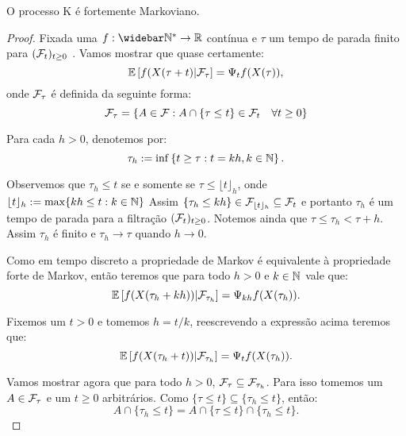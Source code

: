 \begin{proposicao}
  \label{prop:markov-forte}
  O processo K é fortemente Markoviano.
\end{proposicao}
\begin{proof}
  Fixada uma $f: \Nzb \to \R$ contínua e $\tau$ um tempo de parada
  finito para $({\mathcal{F}}_t)_{t \geq 0}$ . Vamos mostrar que quase
  certamente:
  \begin{equation}
    \label{eq:markov-forte}
    {\mathbb{E}} \left[ f(X(\tau + t) \middle| {\mathcal{F}}_\tau \right]
    = \Psi_t f (X(\tau)),
  \end{equation}
  onde ${\mathcal{F}}_\tau$ é definida da seguinte forma:
  \begin{displaymath}
    {\mathcal{F}}_\tau = \left\{
      A \in {\mathcal{F}}:  A \cap \{\tau \leq t\} \in {\mathcal{F}}_t \quad \forall t \geq 0 
    \right\}
  \end{displaymath}


  Para cada $h > 0$, denotemos por: 
  \begin{displaymath}
    \tau_h := \inf\left\{
      t \geq \tau: t = k h, k \in {\mathbb{N}}
    \right\}.
  \end{displaymath}

  Observemos que $\tau_h \leq t$ se e somente se $\tau \leq \lfloor t
  \rfloor_h$, onde $\lfloor t \rfloor_h := \max\{k h \leq t: k \in
  {\mathbb{N}}\}$ Assim $\{\tau_h \leq k h\} \in {\mathcal{F}}_{\lfloor t \rfloor_h}
  \subseteq {\mathcal{F}}_t$ e portanto $\tau_h$ é um tempo de parada para a
  filtração $({\mathcal{F}}_{t})_{t \geq 0}$. Notemos ainda que $\tau \leq \tau_h
  < \tau + h$. Assim $\tau_h$ é \qc finito e $\tau_h \to \tau$ \qc
  quando $h \to 0$.

  Como em tempo discreto a propriedade de Markov é equivalente à
  propriedade forte de Markov, então teremos que para todo $h > 0$ e
  $k \in {\mathbb{N}}$ vale que:
 \begin{displaymath}
    {\mathbb{E}} \left[ f(X(\tau_h + k h)) \middle| {\mathcal{F}}_{\tau_h} \right]
    = \Psi_{k h} f (X(\tau_h)).
  \end{displaymath}
  
  Fixemos um $t > 0$ e tomemos $h = t/k$, reescrevendo a expressão acima
  teremos que:
  \begin{equation}
    \label{eq:markov-forte-esp-cond}
    {\mathbb{E}} \left[ f(X(\tau_h + t)) \middle| {\mathcal{F}}_{\tau_h} \right]
    = \Psi_t f (X(\tau_h)).
  \end{equation}
  

  Vamos mostrar agora que para todo $h > 0$, ${\mathcal{F}}_{\tau} \subseteq
  {\mathcal{F}}_{\tau_h}$. Para isso tomemos um $A \in {\mathcal{F}}_\tau$ e um $t \geq 0$
  arbitrários. Como $\{\tau \leq t\} \subseteq \{\tau_h \leq t\}$,
  então:
  \begin{displaymath}
    A \cap \{ \tau_h \leq t \} =
    A \cap \{ \tau \leq t \} \cap \{ \tau_h \leq t \}.
  \end{displaymath}
  

\end{proof}
